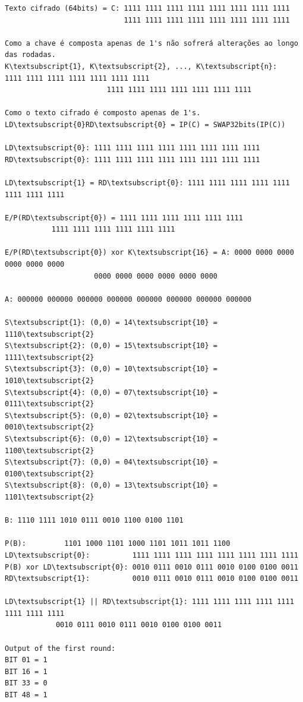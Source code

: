 \documentclass[
    article,            %
    11pt,               %
    oneside,            %
    a4paper,            %
    english,            %
    brazil,             %
    sumario=tradicional,
    ]{abntex2}
\begin{document}
\begin{Verbatim}[commandchars=\\\{\}, fontsize=\footnotesize]
Texto cifrado (64bits) = C: 1111 1111 1111 1111 1111 1111 1111 1111
                            1111 1111 1111 1111 1111 1111 1111 1111

Como a chave é composta apenas de 1's não sofrerá alterações ao longo das rodadas.
K\textsubscript{1}, K\textsubscript{2}, ..., K\textsubscript{n}:         1111 1111 1111 1111 1111 1111 1111
                        1111 1111 1111 1111 1111 1111 1111

Como o texto cifrado é composto apenas de 1's.
LD\textsubscript{0}RD\textsubscript{0} = IP(C) = SWAP32bits(IP(C))

LD\textsubscript{0}: 1111 1111 1111 1111 1111 1111 1111 1111
RD\textsubscript{0}: 1111 1111 1111 1111 1111 1111 1111 1111

LD\textsubscript{1} = RD\textsubscript{0}: 1111 1111 1111 1111 1111 1111 1111 1111

E/P(RD\textsubscript{0}) = 1111 1111 1111 1111 1111 1111
           1111 1111 1111 1111 1111 1111

E/P(RD\textsubscript{0}) xor K\textsubscript{16} = A: 0000 0000 0000 0000 0000 0000
                     0000 0000 0000 0000 0000 0000

A: 000000 000000 000000 000000 000000 000000 000000 000000

S\textsubscript{1}: (0,0) = 14\textsubscript{10} = 1110\textsubscript{2}
S\textsubscript{2}: (0,0) = 15\textsubscript{10} = 1111\textsubscript{2}
S\textsubscript{3}: (0,0) = 10\textsubscript{10} = 1010\textsubscript{2}
S\textsubscript{4}: (0,0) = 07\textsubscript{10} = 0111\textsubscript{2}
S\textsubscript{5}: (0,0) = 02\textsubscript{10} = 0010\textsubscript{2}
S\textsubscript{6}: (0,0) = 12\textsubscript{10} = 1100\textsubscript{2}
S\textsubscript{7}: (0,0) = 04\textsubscript{10} = 0100\textsubscript{2}
S\textsubscript{8}: (0,0) = 13\textsubscript{10} = 1101\textsubscript{2}

B: 1110 1111 1010 0111 0010 1100 0100 1101

P(B):         1101 1000 1101 1000 1101 1011 1011 1100
LD\textsubscript{0}:          1111 1111 1111 1111 1111 1111 1111 1111
P(B) xor LD\textsubscript{0}: 0010 0111 0010 0111 0010 0100 0100 0011
RD\textsubscript{1}:          0010 0111 0010 0111 0010 0100 0100 0011

LD\textsubscript{1} || RD\textsubscript{1}: 1111 1111 1111 1111 1111 1111 1111 1111 
            0010 0111 0010 0111 0010 0100 0100 0011

Output of the first round: 
BIT 01 = 1  
BIT 16 = 1
BIT 33 = 0
BIT 48 = 1
\end{Verbatim}
\end{document}
